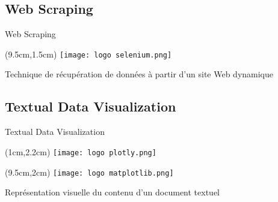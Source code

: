 \documentclass[10pt,sans,usenames,dvipsnames,english,compress]{beamer}
\begin{document}
\subsection{Web Scraping}
\begin{frame}{Web Scraping}
	\begin{textblock*}{3cm}(9.5cm,1.5cm) %
		\texttt{[image: logo selenium.png]}
	\end{textblock*}

	\vspace{1cm}

        \begin{block}{}
		Technique de récupération de données à partir d'un site Web dynamique
	\end{block}

        \vspace{0.5cm}

\end{frame}

\subsection{Textual Data Visualization}
\begin{frame}{Textual Data Visualization}
	\begin{textblock*}{3cm}(1cm,2.2cm)
		\texttt{[image: logo plotly.png]}
	\end{textblock*}

	\begin{textblock*}{3cm}(9.5cm,2cm)
		\texttt{[image: logo matplotlib.png]}
	\end{textblock*}

	\vspace{1cm}

	\begin{block}{}
		Représentation visuelle du contenu d’un document textuel
	\end{block}

        \vspace{0.5cm}

\end{frame}
\end{document}
